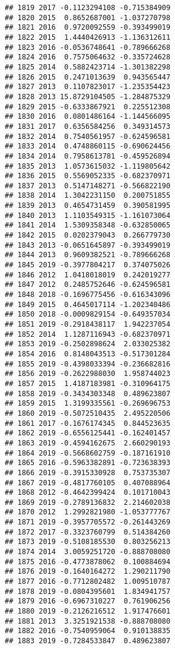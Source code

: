 \documentclass[
]{article}
\begin{document}
\begin{verbatim}
## 1819 2017 -0.1123294108 -0.715384909
## 1820 2015  0.8652687001 -1.037270798
## 1821 2016  0.9720092559 -0.393499019
## 1822 2015  1.4440426913 -1.136312611
## 1823 2016 -0.0536748641 -0.789666268
## 1824 2016  0.7575064632 -0.335724628
## 1825 2014  0.5882423714 -1.301382298
## 1826 2015  0.2471013639  0.943565447
## 1827 2013  0.1107823017 -1.235354423
## 1828 2013 15.8729104505 -1.284875329
## 1829 2015 -0.6333867921  0.225512308
## 1830 2016  0.0801486164 -1.144566095
## 1831 2017  0.6356584256  0.349314573
## 1832 2014  0.7540561957 -0.624596581
## 1833 2014  0.4748860115 -0.690624456
## 1834 2014  0.7958613781 -0.459526894
## 1835 2013  1.0573615032 -1.119805642
## 1836 2015  0.5569052335 -0.682370971
## 1837 2013  0.5147148271 -0.566822190
## 1838 2014  1.3042231150  0.200751855
## 1839 2013  0.4654731459  0.390581995
## 1840 2013  1.1103549315 -1.161073064
## 1841 2014  1.5309358348 -0.632850065
## 1842 2015  0.0202379043  0.266779730
## 1843 2013 -0.0651645897 -0.393499019
## 1844 2013  0.9609382521 -0.789666268
## 1845 2019 -0.3977804217  0.374075026
## 1846 2012  1.0418018019  0.242019277
## 1847 2012  0.2485752646 -0.624596581
## 1848 2018 -0.1696775456 -0.616343096
## 1849 2015  0.4645017114 -1.202340486
## 1850 2018 -0.0009829154 -0.649357034
## 1851 2019 -0.2918438117  1.942237054
## 1852 2014  1.1287116943 -0.682370971
## 1853 2019 -0.2502898624  2.033025382
## 1854 2016  0.8148043513 -0.517301284
## 1855 2019 -0.4398033394 -0.236682816
## 1856 2019 -0.2622988030  1.958744023
## 1857 2015  1.4187183981 -0.310964175
## 1858 2019 -0.3434303348  0.489623807
## 1859 2015  1.3199335561 -0.269696753
## 1860 2019 -0.5072510435  2.495220506
## 1861 2017 -0.1676174345  0.844523635
## 1862 2019 -0.6556125441 -0.162401457
## 1863 2019 -0.4594162675  2.660290193
## 1864 2019 -0.5668602759 -0.187161910
## 1865 2016 -0.5963382891 -0.723638393
## 1866 2019 -0.3915330928  0.753735307
## 1867 2019 -0.4817760105  0.407088964
## 1868 2012 -0.4642399424  0.101710043
## 1869 2019 -0.2789136832  2.214602038
## 1870 2012  1.2992821980 -1.053777767
## 1871 2019 -0.3957705572 -0.261443269
## 1872 2017 -0.3323760799  0.514384260
## 1873 2019 -0.5108185530  0.803256213
## 1874 2014  3.0059251720 -0.888708080
## 1875 2016 -0.4773878062  0.100884694
## 1876 2019 -0.1640164272  1.290211790
## 1877 2016 -0.7712802482  1.009510787
## 1878 2019 -0.0804395601  1.834941757
## 1879 2016 -0.6967310227  0.761906256
## 1880 2019 -0.2126216512  1.917476601
## 1881 2013  3.3251921538 -0.888708080
## 1882 2016 -0.7540959064  0.910138835
## 1883 2019 -0.7284533847  0.489623807

\end{verbatim}
\end{document}
